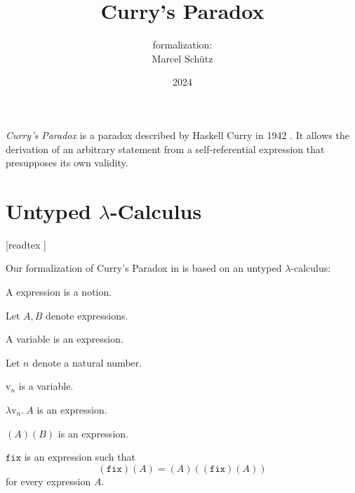 \documentclass{article}
\title{Curry's Paradox}
\author{\Naproche formalization: \vspace{0.5em} \\
Marcel Schütz}
\date{2024}
\newcommand{\var}[1]{\textrm{v}_{#1}}
\newcommand{\abs}[2]{\lambda\var{#1}.\ #2}
\newcommand{\app}[2]{(#1)(#2)}
\newcommand{\fix}{\texttt{fix}}
\begin{document}
  \maketitle

  \noindent \emph{Curry's Paradox} is a paradox described by Haskell Curry in 
  1942 \cite{Curry1942}.
  It allows the derivation of an arbitrary statement from a self-referential 
  expression that presupposes its own validity.

  \section*{Untyped $\lambda$-Calculus}

  \begin{imports}
    \begin{forthel}
      [readtex ]
    \end{forthel}
  \end{imports}

  \noindent Our formalization of Curry's Paradox in \Naproche is based on an 
  untyped $\lambda$-calculus:

  \begin{forthel}
    \begin{signature*}
      A expression is a notion.
    \end{signature*}
  
    Let $A, B$ denote expressions.
  
    \begin{signature*}
      A variable is an expression.
    \end{signature*}
  
    Let $n$ denote a natural number.
  
    \begin{signature*}
      $\var{n}$ is a variable.
    \end{signature*}
  
    \begin{signature*}[Abstraction]\label{abstraction}
      $\abs{n}{A}$ is an expression.
    \end{signature*}
  
    \begin{signature*}[Application]\label{application}
      $\app{A}{B}$ is an expression.
    \end{signature*}
  
    \begin{signature*}\label{fixed_point_combinator}
      $\fix$ is an expression such that
      \[\app{\fix}{A} = \app{A}{\app{\fix}{A}}\]
      for every expression $A$.
    \end{signature*}
  \end{forthel}
\end{document}
